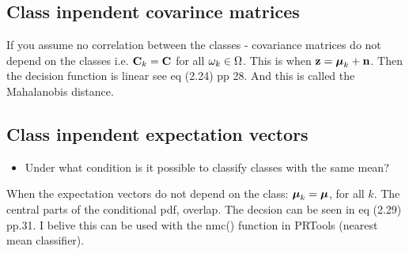 \subsection{Class inpendent covarince matrices}
\label{sub:Class inpendent covarince matrices}
If you assume no correlation between the classes - covariance matrices do not depend on the classes i.e. $\mathbf{C}_k = \mathbf{C}$ for all $\omega_k \in \Omega$. This is when $\mathbf{z} = \boldsymbol\mu_k + \mathbf{n}$. Then the decision function is linear see eq (2.24) pp 28.
And this is called the Mahalanobis distance.
\subsection{Class inpendent expectation vectors}
\begin{itemize}
    \item Under what condition is it possible to classify classes with the same mean?
\end{itemize}
When the expectation vectors do not depend on the class: $\boldsymbol\mu_k = \boldsymbol\mu$, for all $k$. The central parts of the conditional pdf, overlap. The decsion can be seen in eq (2.29) pp.31.
I belive this can be used with the nmc() function in PRTools (nearest mean classifier). 










\label{task:20140926_jm1}
